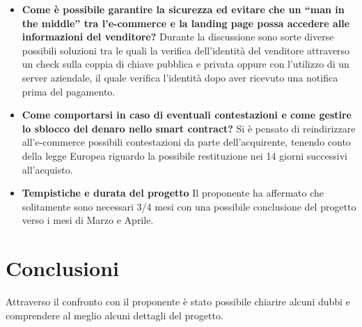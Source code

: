 \documentclass[a4paper,12pt]{article}
\begin{document}
\begin{itemize}
\item \textbf{Come è possibile garantire la sicurezza ed evitare che un “man in the middle” tra l’e-commerce e la landing page possa accedere alle informazioni del venditore?}
Durante la discussione sono sorte diverse possibili soluzioni tra le quali la verifica dell’identità del venditore attraverso un check sulla coppia di chiave pubblica e privata oppure con l’utilizzo di un server aziendale, il quale verifica l’identità dopo aver ricevuto una notifica prima del pagamento.

\item \textbf{Come comportarsi in caso di eventuali contestazioni e come gestire lo sblocco del denaro nello smart contract?}
Si è pensato di reindirizzare all’e-commerce possibili contestazioni da parte dell’acquirente, tenendo conto della legge Europea riguardo la possibile restituzione nei 14 giorni successivi all’acquisto.

\item \textbf{Tempistiche e durata del progetto}
Il proponente ha affermato che solitamente sono necessari 3/4 mesi con una possibile conclusione del progetto verso i mesi di Marzo e Aprile.
\end{itemize}

\section{Conclusioni}
Attraverso il confronto con il proponente è stato possibile chiarire alcuni dubbi e comprendere al meglio alcuni dettagli del progetto.
\end{document}
